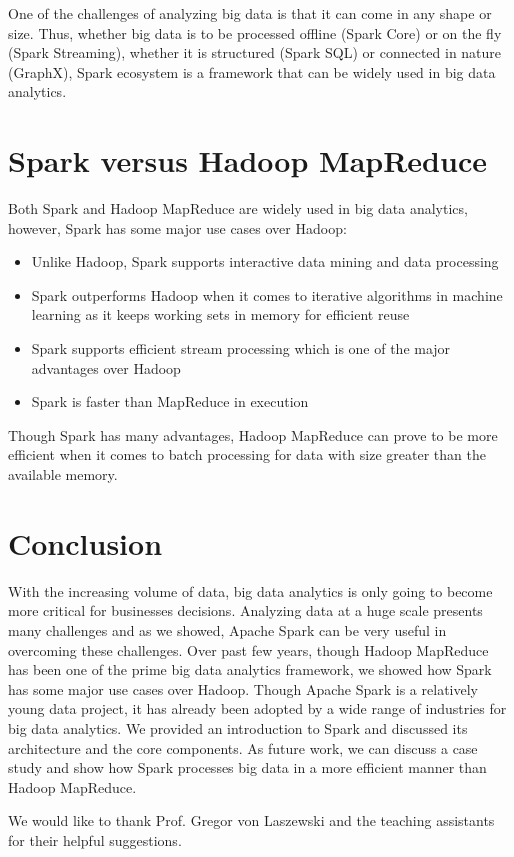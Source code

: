 \documentclass[sigconf]{acmart}
\begin{document}
One of the challenges of analyzing big data is that it can come in any shape or size. Thus, whether big data is to be processed offline (Spark Core) or on the fly (Spark Streaming), whether it is structured (Spark SQL) or connected in nature (GraphX), Spark ecosystem is a framework that can be widely used in big data analytics.

\section{Spark versus Hadoop MapReduce}
Both Spark and Hadoop MapReduce are widely used in big data analytics, however, Spark has some major use cases over Hadoop\cite{verma2016big-p3}:
\begin{itemize}
	\item Unlike Hadoop, Spark supports interactive data mining and data processing
  \item Spark outperforms Hadoop when it comes to iterative algorithms in machine learning as it keeps working sets in memory for efficient reuse  
  \item Spark supports efficient stream processing which is one of the major advantages over Hadoop
  \item Spark is faster than MapReduce in execution
\end{itemize}

Though Spark has many advantages, Hadoop MapReduce can prove to be more efficient when it comes to batch processing for data with size greater than the available memory.

\section{Conclusion}
With the increasing volume of data, big data analytics is only going to become more critical for businesses decisions. Analyzing data at a huge scale presents many challenges and as we showed, Apache Spark can be very useful in overcoming these challenges. Over past few years, though Hadoop MapReduce has been one of the prime big data analytics framework, we showed how Spark has some major use cases over Hadoop. Though Apache Spark is a relatively young data project, it has already been adopted by a wide range of industries for big data analytics. We provided an introduction to Spark and discussed its architecture and the core components. As future work, we can discuss a case study and show how Spark processes big data in a more efficient manner than Hadoop MapReduce.

\begin{acks}

  We would like to thank Prof. Gregor von Laszewski and the teaching assistants for their helpful suggestions. 

\end{acks}


 
\end{document}
